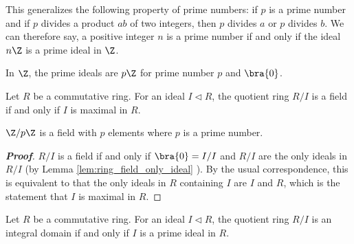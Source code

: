 \begin{remark}
This generalizes the following property of prime numbers: if $p$ is a prime number and if $p$ divides a product $ab$ of two integers, then $p$ divides $a$ or $p$ divides $b$. We can therefore say, a positive integer $n$ is a prime number if and only if the ideal $n\Z$ is a prime ideal in $\Z$.
\end{remark}

\begin{example}
In $\Z$, the prime ideals are $p\Z$ for prime number $p$ and $\bra{0}$.
\end{example}

\begin{lemma}\label{lem:field_maximal_ideal}
Let $R$ be a commutative ring. For an ideal $I \lhd R$, the quotient ring $R/I$ is a field if and only if $I$ is maximal in $R$.
\end{lemma}

\begin{example}\label{exa:zpz_field}
$\Z/p\Z$ is a field with $p$ elements where $p$ is a prime number.
\end{example}





\begin{proof}[\bf Proof]
$R/I$ is a field if and only if $\bra{0} = I/I$ and $R/I$ are the only ideals in $R/I$ (by Lemma \ref{lem:ring_field_only_ideal} ). By the usual correspondence, this is equivalent to that the only ideals in $R$ containing $I$ are $I$ and $R$, which is the statement that $I$ is maximal in $R$.
\end{proof}

\begin{lemma}\label{lem:integral_domain_prime_ideal}
Let $R$ be a commutative ring. For an ideal $I \lhd R$, the quotient ring $R/I$ is an integral domain if and only if $I$ is a prime ideal in $R$.
\end{lemma}

